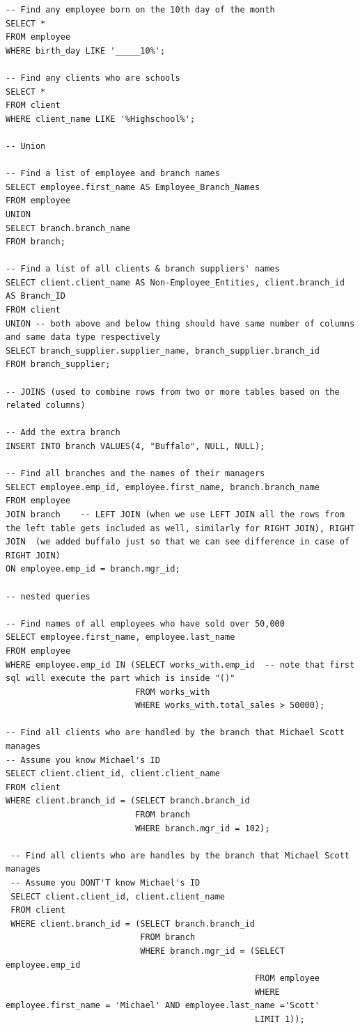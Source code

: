 \documentclass[8pt, a4paper, oneside, twocolumn]{extarticle}
\begin{document}
\begin{verbatim}
-- Find any employee born on the 10th day of the month
SELECT *
FROM employee
WHERE birth_day LIKE '_____10%';

-- Find any clients who are schools
SELECT *
FROM client
WHERE client_name LIKE '%Highschool%';

-- Union

-- Find a list of employee and branch names
SELECT employee.first_name AS Employee_Branch_Names
FROM employee
UNION
SELECT branch.branch_name
FROM branch;

-- Find a list of all clients & branch suppliers' names
SELECT client.client_name AS Non-Employee_Entities, client.branch_id AS Branch_ID
FROM client
UNION -- both above and below thing should have same number of columns and same data type respectively
SELECT branch_supplier.supplier_name, branch_supplier.branch_id
FROM branch_supplier;

-- JOINS (used to combine rows from two or more tables based on the related columns)

-- Add the extra branch
INSERT INTO branch VALUES(4, "Buffalo", NULL, NULL);

-- Find all branches and the names of their managers
SELECT employee.emp_id, employee.first_name, branch.branch_name
FROM employee
JOIN branch    -- LEFT JOIN (when we use LEFT JOIN all the rows from the left table gets included as well, similarly for RIGHT JOIN), RIGHT JOIN  (we added buffalo just so that we can see difference in case of RIGHT JOIN)
ON employee.emp_id = branch.mgr_id;

-- nested queries

-- Find names of all employees who have sold over 50,000
SELECT employee.first_name, employee.last_name
FROM employee
WHERE employee.emp_id IN (SELECT works_with.emp_id  -- note that first sql will execute the part which is inside "()"
                          FROM works_with
                          WHERE works_with.total_sales > 50000);

-- Find all clients who are handled by the branch that Michael Scott manages
-- Assume you know Michael's ID
SELECT client.client_id, client.client_name
FROM client
WHERE client.branch_id = (SELECT branch.branch_id
                          FROM branch
                          WHERE branch.mgr_id = 102);

 -- Find all clients who are handles by the branch that Michael Scott manages
 -- Assume you DONT'T know Michael's ID
 SELECT client.client_id, client.client_name
 FROM client
 WHERE client.branch_id = (SELECT branch.branch_id
                           FROM branch
                           WHERE branch.mgr_id = (SELECT employee.emp_id
                                                  FROM employee
                                                  WHERE employee.first_name = 'Michael' AND employee.last_name ='Scott'
                                                  LIMIT 1));



\end{verbatim}
\end{document}
